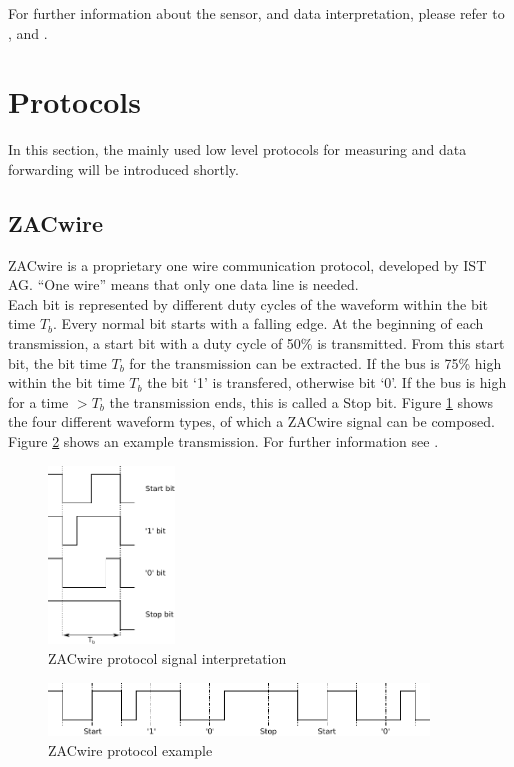 \documentclass[a4paper]{scrreprt}
\begin{document}
For further information about the sensor, and data interpretation, please refer to \cite{hyt}, \cite{hyt3} and \cite{hyt2}.
\section{Protocols}
In this section, the mainly used low level protocols for measuring and data forwarding will be introduced shortly. 
\subsection{ZACwire}\label{chap:zac}
ZACwire is a proprietary one wire communication protocol, developed
by IST AG. ``One wire'' means that only one data line is needed.\\
Each bit is represented by
different duty cycles of the waveform within the bit time $T_b$.
Every normal bit starts with a falling edge. At the beginning
of each transmission, a start bit with a duty cycle of 50\% is
transmitted. From this start bit, the bit time $T_b$ for the
transmission can be extracted. 
If the bus is 75\% high within the bit time $T_b$ the bit `1' is transfered, otherwise bit `0'. 
If the bus is high for a time $>T_b$
the transmission ends, this is called a Stop bit. Figure \ref{fig:zac}
shows the four different waveform types, of which a ZACwire signal can be
composed. Figure \ref{fig:zacexample} shows an example
transmission. For further information see \cite{zac}.
\begin{figure}[Hh!]
	\centering
	\includegraphics[width=0.3\textwidth]{img/zac_bits.pdf}
	\caption{ZACwire protocol signal interpretation}
	\label{fig:zac}
\end{figure}
\begin{figure}[h]
	\centering
	\includegraphics[width=0.9\textwidth]{img/zac_example.pdf}
	\caption{ZACwire protocol example}
	\label{fig:zacexample}
\end{figure}
\end{document}
